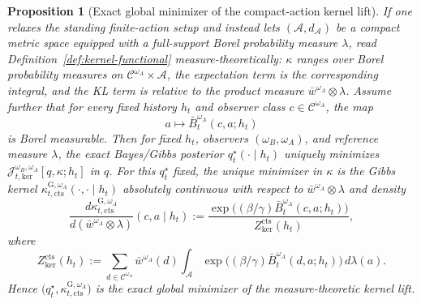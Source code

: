 \documentclass[11pt]{article}
\newtheorem{proposition}[theorem]{Proposition}
\theoremstyle{definition}
\theoremstyle{remark}
\newcommand{\Acal}{\mathcal{A}}
\newcommand{\Ccal}{\mathcal{C}}
\begin{document}
\begin{proposition}[Exact global minimizer of the compact-action kernel lift]
\label{prop:kernel-functional-minimizer-compact}
If one relaxes the standing finite-action setup and instead lets $(\Acal,d_\Acal)$ be a compact metric space equipped with a full-support Borel probability measure $\lambda$, read Definition~\ref{def:kernel-functional} measure-theoretically: $\kappa$ ranges over Borel probability measures on $\Ccal^{\omega_A}\times\Acal$, the expectation term is the corresponding integral, and the KL term is relative to the product measure $\bar w^{\omega_A}\otimes\lambda$. Assume further that for every fixed history $h_t$ and observer class $c\in\Ccal^{\omega_A}$, the map
\[
a\longmapsto \bar B_t^{\omega_A}(c,a;h_t)
\]
is Borel measurable. Then for fixed $h_t$, observers $(\omega_B,\omega_A)$, and reference measure $\lambda$, the exact Bayes/Gibbs posterior $q_t^\star(\cdot\mid h_t)$ uniquely minimizes $\mathcal J_{t,\mathrm{ker}}^{\omega_B,\omega_A}[q,\kappa;h_t]$ in $q$. For this $q_t^\star$ fixed, the unique minimizer in $\kappa$ is the Gibbs kernel $\kappa_{t,\mathrm{cts}}^{\mathrm G,\omega_A}(\cdot,\cdot\mid h_t)$ absolutely continuous with respect to $\bar w^{\omega_A}\otimes\lambda$ and density
\[
\frac{d\kappa_{t,\mathrm{cts}}^{\mathrm G,\omega_A}}{d(\bar w^{\omega_A}\otimes\lambda)}(c,a\mid h_t)
:=
\frac{\exp\!\bigl((\beta/\gamma)\bar B_t^{\omega_A}(c,a;h_t)\bigr)}
{Z_{\mathrm{ker}}^{\mathrm{cts}}(h_t)},
\]
where
\[
Z_{\mathrm{ker}}^{\mathrm{cts}}(h_t)
:=
\sum_{d\in\Ccal^{\omega_A}}\bar w^{\omega_A}(d)\int_{\Acal}
\exp\!\bigl((\beta/\gamma)\bar B_t^{\omega_A}(d,a;h_t)\bigr)\,d\lambda(a).
\]
Hence $\bigl(q_t^\star,\kappa_{t,\mathrm{cts}}^{\mathrm G,\omega_A}\bigr)$ is the exact global minimizer of the measure-theoretic kernel lift.
\end{proposition}
\end{document}
